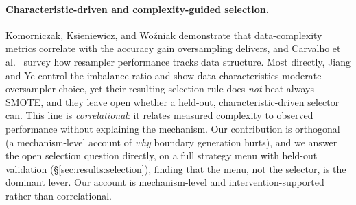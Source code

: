 \paragraph{Characteristic-driven and complexity-guided selection.}
Komorniczak, Ksieniewicz, and Wo{\'z}niak \cite{komorniczak2022data}
demonstrate that data-complexity metrics correlate with the accuracy gain
oversampling delivers, and Carvalho et al.\ \cite{carvalho2025resampling} survey
how resampler performance tracks data structure. Most directly, Jiang and Ye
\cite{jiang2026beyond} control the imbalance ratio and show data characteristics
moderate oversampler choice, yet their resulting selection rule does \emph{not}
beat always-SMOTE, and they leave open whether a held-out, characteristic-driven
selector can. This line is \emph{correlational}: it relates measured complexity to
observed performance without explaining the mechanism. Our contribution is
orthogonal (a mechanism-level account of \emph{why} boundary generation hurts), and we
answer the open selection question directly, on a full strategy menu with held-out
validation (\S\ref{sec:results:selection}), finding that the menu, not the
selector, is the dominant lever. Our account is mechanism-level and
intervention-supported rather than correlational.

